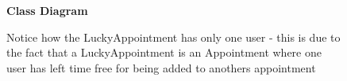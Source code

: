 	\begin {figure}
	\textbf{Class Diagram}
	\caption{Notice how the LuckyAppointment has only one user - this is due to the fact that a LuckyAppointment is an Appointment where one user has left time free for being added to anothers appointment}
	\end{figure}